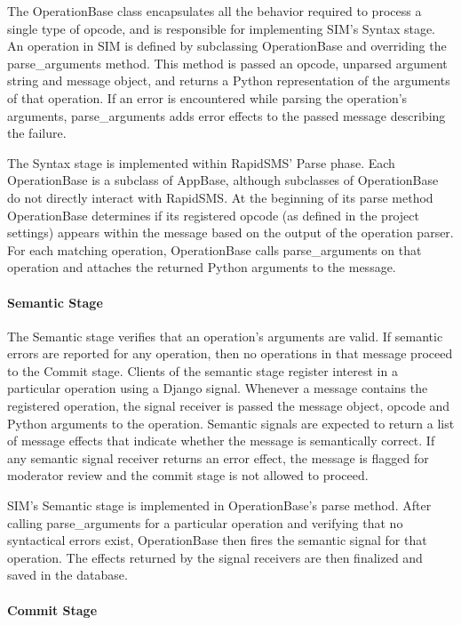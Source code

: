 \documentclass{acm_proc_article-sp}
\begin{document}
The OperationBase class encapsulates all the behavior required to process a single type of opcode, and is responsible for implementing SIM's Syntax stage. An operation in SIM is defined by subclassing OperationBase and overriding the parse\_arguments method. This method is passed an opcode, unparsed argument string and message object, and returns a Python representation of the arguments of that operation. If an error is encountered while parsing the operation's arguments, parse\_arguments adds error effects to the passed message describing the failure.

The Syntax stage is implemented within RapidSMS' Parse phase. Each OperationBase is a subclass of AppBase, although subclasses of OperationBase do not directly interact with RapidSMS. At the beginning of its parse method OperationBase determines if its registered opcode (as defined in the project settings) appears within the message based on the output of the operation parser. For each matching operation, OperationBase calls parse\_arguments on that operation and attaches the returned Python arguments to the message.

\paragraph{Semantic Stage}

The Semantic stage verifies that an operation's arguments are valid. If semantic errors are reported for any operation, then no operations in that message proceed to the Commit stage. Clients of the semantic stage register interest in a particular operation using a Django signal. Whenever a message contains the registered operation, the signal receiver is passed the message object, opcode and Python arguments to the operation. Semantic signals are expected to return a list of message effects that indicate whether the message is semantically correct. If any semantic signal receiver returns an error effect, the message is flagged for moderator review and the commit stage is not allowed to proceed.

SIM's Semantic stage is implemented in OperationBase's parse method. After calling parse\_arguments for a particular operation and verifying that no syntactical errors exist, OperationBase then fires the semantic signal for that operation. The effects returned by the signal receivers are then finalized and saved in the database.

\paragraph{Commit Stage}
\end{document}
